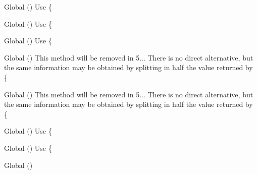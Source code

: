 \begin{DoxyRefList}
\item[Global \doxylink{class_ramsey_1_1_uuid_1_1_lazy_1_1_lazy_uuid_from_string_a353dfd5c6c87ff413f6e82fe9a82eb70}{Lazy\+Uuid\+From\+String\+::get\+Clock\+Seq\+Hi\+And\+Reserved} ()]\label{deprecated__deprecated000306}%
%
Use \{ 
\item[Global \doxylink{class_ramsey_1_1_uuid_1_1_lazy_1_1_lazy_uuid_from_string_a4b33ab021dedc57f5f05f9a89c050d6a}{Lazy\+Uuid\+From\+String\+::get\+Clock\+Seq\+Low} ()]\label{deprecated__deprecated000307}%
%
Use \{ 
\item[Global \doxylink{class_ramsey_1_1_uuid_1_1_lazy_1_1_lazy_uuid_from_string_a69af002f4eae76e4b8ce2708237772e2}{Lazy\+Uuid\+From\+String\+::get\+Clock\+Sequence} ()]\label{deprecated__deprecated000308}%
%
Use \{ 
\item[Global \doxylink{class_ramsey_1_1_uuid_1_1_lazy_1_1_lazy_uuid_from_string_ac390b06f87193c7e996214539492f874}{Lazy\+Uuid\+From\+String\+::get\+Least\+Significant\+Bits} ()]\label{deprecated__deprecated000309}%
%
This method will be removed in 5... There is no direct alternative, but the same information may be obtained by splitting in half the value returned by \{ 
\item[Global \doxylink{class_ramsey_1_1_uuid_1_1_lazy_1_1_lazy_uuid_from_string_a0092bdbdf25e1daaf521df1787df0e40}{Lazy\+Uuid\+From\+String\+::get\+Most\+Significant\+Bits} ()]\label{deprecated__deprecated000310}%
%
This method will be removed in 5... There is no direct alternative, but the same information may be obtained by splitting in half the value returned by \{ 
\item[Global \doxylink{class_ramsey_1_1_uuid_1_1_lazy_1_1_lazy_uuid_from_string_a3a0d17930cbcc57bef84064afcc1a837}{Lazy\+Uuid\+From\+String\+::get\+Node} ()]\label{deprecated__deprecated000311}%
%
Use \{ 
\item[Global \doxylink{class_ramsey_1_1_uuid_1_1_lazy_1_1_lazy_uuid_from_string_af66d1556704169933700e0570af220b2}{Lazy\+Uuid\+From\+String\+::get\+Time\+Hi\+And\+Version} ()]\label{deprecated__deprecated000312}%
%
Use \{ 
\item[Global \doxylink{class_ramsey_1_1_uuid_1_1_lazy_1_1_lazy_uuid_from_string_a45160120925d388b15802b9a5a0354e6}{Lazy\+Uuid\+From\+String\+::get\+Time\+Low} ()]\label{deprecated__deprecated000313}%

\end{DoxyRefList}
